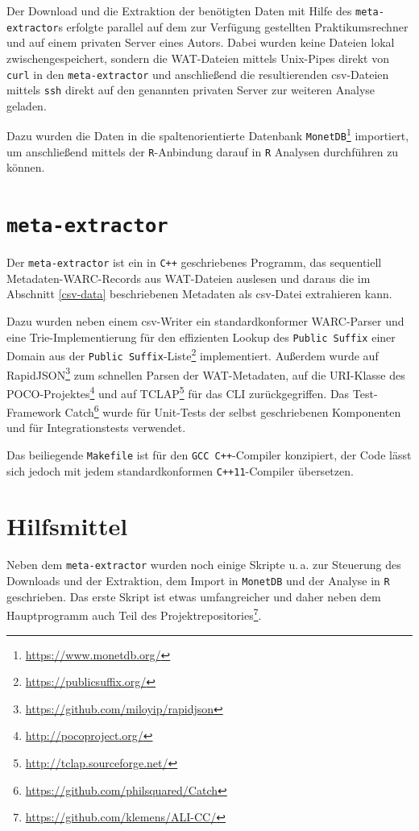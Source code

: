 \documentclass[a4paper,12pt,titlepage=false]{scrreprt}
\begin{document}
Der Download und die Extraktion der benötigten Daten mit Hilfe des
\texttt{meta-extractor}s erfolgte parallel auf dem zur Verfügung gestellten
Praktikumsrechner und auf einem privaten Server eines Autors. Dabei wurden keine
Dateien lokal zwischengespeichert, sondern die WAT-Dateien mittels Unix-Pipes
direkt von \texttt{curl} in den \texttt{meta-extractor} und anschließend die
resultierenden csv-Dateien mittels \texttt{ssh} direkt auf den genannten
privaten Server zur weiteren Analyse geladen.

Dazu wurden die Daten in die spaltenorientierte Datenbank
\texttt{MonetDB}\footnote{\url{https://www.monetdb.org/}} importiert, um
anschließend mittels der \texttt{R}-Anbindung darauf in \texttt{R} Analysen
durchführen zu können.

\section{\texttt{meta-extractor}}

Der \texttt{meta-extractor} ist ein in \texttt{C++} geschriebenes Programm,
das sequentiell Metadaten-WARC-Records aus WAT-Dateien auslesen und daraus
die im Abschnitt \ref{csv-data} beschriebenen Metadaten als csv-Datei extrahieren
kann.

Dazu wurden neben einem csv-Writer ein standardkonformer WARC-Parser und eine
Trie-Implementierung für den effizienten Lookup des \texttt{Public Suffix} einer
Domain aus der \texttt{Public Suffix}-Liste\footnote{\url{https://publicsuffix.org/}} implementiert. Außerdem wurde auf RapidJSON\footnote{\url{https://github.com/miloyip/rapidjson}}
zum schnellen Parsen der WAT-Metadaten, auf die URI-Klasse des
POCO-Projektes\footnote{\url{http://pocoproject.org/}} und auf
TCLAP\footnote{\url{http://tclap.sourceforge.net/}} für das CLI zurückgegriffen. Das Test-Framework Catch\footnote{\url{https://github.com/philsquared/Catch}} wurde für Unit-Tests der selbst geschriebenen Komponenten und für Integrationstests verwendet.

Das beiliegende \texttt{Makefile} ist für den \texttt{GCC C++}-Compiler konzipiert, der Code lässt sich jedoch mit jedem standardkonformen \texttt{C++11}-Compiler übersetzen.

\section{Hilfsmittel}

Neben dem \texttt{meta-extractor} wurden noch einige Skripte u.\,a. zur
Steuerung des Downloads und der Extraktion, dem Import in \texttt{MonetDB} und
der Analyse in \texttt{R} geschrieben. Das erste Skript ist etwas umfangreicher
und daher neben dem Hauptprogramm auch Teil des
Projektrepositories\footnote{\url{https://github.com/klemens/ALI-CC/}}.
\end{document}
